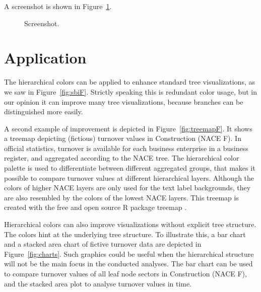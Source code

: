 \documentclass[journal]{vgtc}                %
\begin{document}
A screenshot is shown in Figure~\ref{fig:screen}.

\begin{figure}[htb]
  \centering
  \caption{Screenshot.}\label{fig:screen}
\end{figure}



\section{Application}\label{secapplication}
The hierarchical colors can be applied to enhance standard tree visualizations, as we saw in Figure~\ref{fig:sbiF}. Strictly speaking this is redundant color usage, but in our opinion it can improve many tree visualizations, because branches can be distinguished more easily. 

A second example of improvement is depicted in Figure~\ref{fig:treemapF}. It shows a treemap depicting (fictious) turnover values in Construction (NACE F). In official statistics, turnover is available for each business enterprise in a business register, and aggregated according to the NACE tree. The hierarchical color palette is used to differentiate between different aggregated groups, that makes it possible to compare turnover values at different hierarchical layers. Although the colors of higher NACE layers are only used for the text label backgrounds, they are also resembled by the colors of the lowest NACE layers. This treemap is created with the free and open source R package treemap \cite{treemap}.

Hierarchical colors can also improve visualizations without explicit tree structure. The colors hint at the underlying tree structure.
To illustrate this, a bar chart and a stacked area chart of fictive turnover data are depicted in Figure~\ref{fig:charts}. Such graphics could be useful when the hierarchical structure will not be the main focus in the conducted analyses. The bar chart can be used to compare turnover values of all leaf node sectors in Construction (NACE F), and the stacked area plot to analyse turnover values in time.
\end{document}
